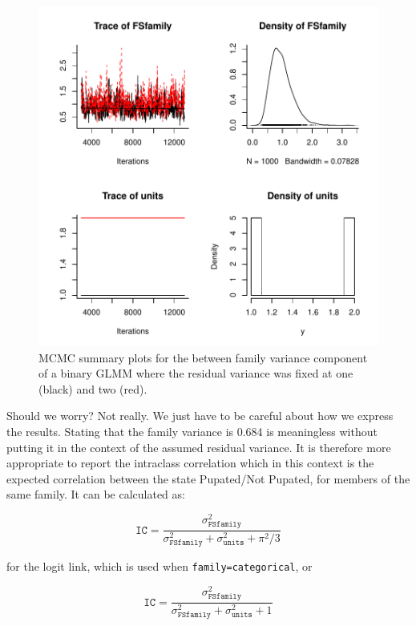 \documentclass{article}
\begin{document}
\begin{figure}[!h]
\begin{center}
\includegraphics{Lecture2-065}
\end{center}
\caption{MCMC summary plots for the between family variance component of a binary GLMM where the residual variance was fixed at one (black) and two (red).}
\label{Bin2-fig}
\end{figure}

Should we worry? Not really. We just have to be careful about how we express the results. Stating that the family variance is 0.684 is meaningless without putting it in the context of the assumed residual variance. It is therefore more appropriate to report the intraclass correlation which in this context is the expected correlation between the state Pupated/Not Pupated, for members of the same family. It can be calculated as:

\begin{equation}
\texttt{IC} =  \frac{\sigma^{2}_{\texttt{FSfamily}}}{\sigma^{2}_{\texttt{FSfamily}}+\sigma^{2}_{\texttt{units}}+\pi^{2}/3} 
\end{equation} 

for the logit link, which is used when \texttt{family=categorical}, or 

\begin{equation}
\texttt{IC} =  \frac{\sigma^{2}_{\texttt{FSfamily}}}{\sigma^{2}_{\texttt{FSfamily}}+\sigma^{2}_{\texttt{units}}+1} 
\end{equation} 
\end{document}
